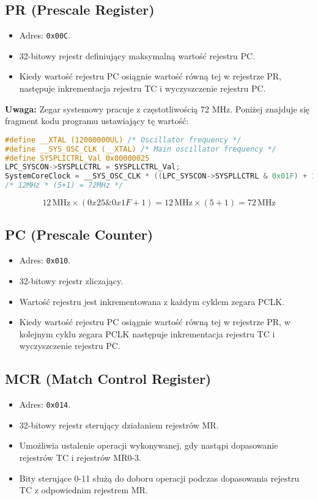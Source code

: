\documentclass[a4paper,12pt]{report}
\begin{document}
\subsection{PR (Prescale Register)}
\begin{itemize}
    \item Adres: \texttt{0x00C}.
    \item 32-bitowy rejestr definiujący maksymalną wartość rejestru PC.
    \item Kiedy wartość rejestru PC osiągnie wartość równą tej w rejestrze PR, następuje inkrementacja rejestru TC i wyczyszczenie rejestru PC.
\end{itemize}

\textbf{Uwaga:} Zegar systemowy pracuje z częstotliwością 72 MHz. Poniżej znajduje się fragment kodu programu ustawiający tę wartość:
\begin{lstlisting}[language=C]
#define __XTAL (12000000UL) /* Oscillator frequency */
#define __SYS_OSC_CLK (__XTAL) /* Main oscillator frequency */
#define SYSPLICTRL_Val 0x00000025
LPC_SYSCON->SYSPLLCTRL = SYSPLLCTRL_Val;
SystemCoreClock = __SYS_OSC_CLK * ((LPC_SYSCON->SYSPLLCTRL & 0x01F) + 1);
/* 12MHz * (5+1) = 72MHz */
\end{lstlisting}

\[
12\,\mathrm{MHz} \times (0x25 \& 0x1F + 1) = 12\,\mathrm{MHz} \times (5+1) = 72\,\mathrm{MHz}
\]

\subsection{PC (Prescale Counter)}
\begin{itemize}
    \item Adres: \texttt{0x010}.
    \item 32-bitowy rejestr zliczający.
    \item Wartość rejestru jest inkrementowana z każdym cyklem zegara PCLK.
    \item Kiedy wartość rejestru PC osiągnie wartość równą tej w rejestrze PR, w kolejnym cyklu zegara PCLK następuje inkrementacja rejestru TC i wyczyszczenie rejestru PC.
\end{itemize}

\subsection{MCR (Match Control Register)}
\begin{itemize}
    \item Adres: \texttt{0x014}.
    \item 32-bitowy rejestr sterujący działaniem rejestrów MR.
    \item Umożliwia ustalenie operacji wykonywanej, gdy nastąpi dopasowanie rejestrów TC i rejestrów MR0-3.
    \item Bity sterujące 0-11 służą do doboru operacji podczas dopasowania rejestru TC z odpowiednim rejestrem MR.
\end{itemize}
\end{document}
